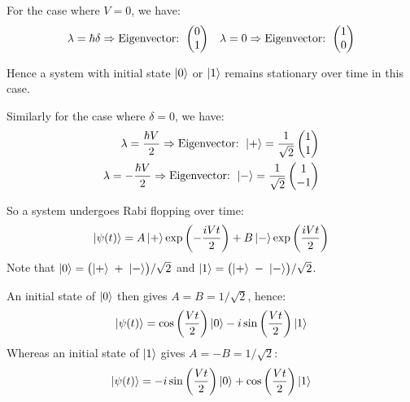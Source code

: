 \begin{parts}
	For the case where $V = 0$, we have:
	\begin{align*}
		\lambda = \hbar\delta \Rightarrow \textnormal{Eigenvector: }
		\begin{pmatrix}
			0 \\ 1
		\end{pmatrix}
		&& \lambda = 0 \Rightarrow \textnormal{Eigenvector: }
		\begin{pmatrix}
			1 \\ 0
		\end{pmatrix}
	\end{align*}
	
	Hence a system with initial state $\ket{0}$ or $\ket{1}$ remains stationary over time in this case.
	
	Similarly for the case where $\delta = 0$, we have:
	\begin{align*}
		\lambda = \frac{\hbar V}{2} \Rightarrow \textnormal{Eigenvector: }
		\ket{+} = \frac{1}{\sqrt{2}}
		\begin{pmatrix}
			1 \\ 1
		\end{pmatrix} \\
		\lambda = -\frac{\hbar V}{2} \Rightarrow \textnormal{Eigenvector: }
		\ket{-} = \frac{1}{\sqrt{2}}
		\begin{pmatrix}
			1 \\ -1
		\end{pmatrix}
	\end{align*}
	
	So a system undergoes Rabi flopping over time:
	\begin{equation*}
		\ket{\psi(t)} = A \ket{+} \exp\left(-\frac{iVt}{2}\right) + B \ket{-} \exp\left(\frac{iVt}{2}\right)
	\end{equation*}
	Note that $\ket{0} = \bigl(\ket{+} \;+\; \ket{-}\bigr) / \sqrt{2}$ and $\ket{1} = \bigl(\ket{+} \;-\; \ket{-}\bigr) / \sqrt{2}$.
	
	An initial state of $\ket{0}$ then gives $A = B = 1/\sqrt{2}$, hence:
	\begin{equation*}
		\ket{\psi(t)} = \cos\left(\frac{Vt}{2}\right) \ket{0} -i\sin\left(\frac{Vt}{2}\right) \ket{1}
	\end{equation*}
	Whereas an initial state of $\ket{1}$ gives $A = -B = 1/\sqrt{2}$:
	\begin{equation*}
		\ket{\psi(t)} = -i\sin\left(\frac{Vt}{2}\right) \ket{0} + \cos\left(\frac{Vt}{2}\right) \ket{1}
	\end{equation*}
	

\end{parts}
